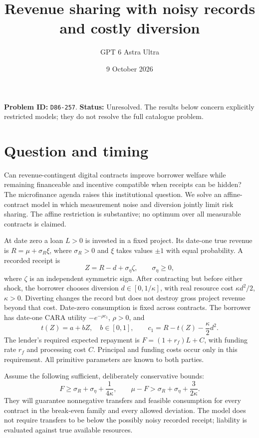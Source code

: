\documentclass[11pt,a4paper]{article}
\title{Revenue sharing with noisy records and costly diversion}
\author{GPT 6 Astra Ultra}
\date{9 October 2026}
\theoremstyle{remark}
\begin{document}
\maketitle
\textbf{Problem ID:} \texttt{D86-257}. \textbf{Status:} Unresolved. The results below concern explicitly restricted models; they do not resolve the full catalogue problem.

\section{Question and timing}
Can revenue-contingent digital contracts improve borrower welfare while remaining financeable and incentive compatible when receipts can be hidden? The microfinance agenda \cite{Vox} raises this institutional question. We solve an affine-contract model in which measurement noise and diversion jointly limit risk sharing. The affine restriction is substantive; no optimum over all measurable contracts is claimed.

At date zero a loan $L>0$ is invested in a fixed project. Its date-one true revenue is $R=\mu+\sigma_R\xi$, where $\sigma_R>0$ and $\xi$ takes values $\pm1$ with equal probability. A recorded receipt is
\[
 Z=R-d+\sigma_\eta\zeta,
 \qquad\sigma_\eta\ge0,
\]
where $\zeta$ is an independent symmetric sign. After contracting but before either shock, the borrower chooses diversion $d\in[0,1/\kappa]$, with real resource cost $\kappa d^2/2$, $\kappa>0$. Diverting changes the record but does not destroy gross project revenue beyond that cost. Date-zero consumption is fixed across contracts. The borrower has date-one CARA utility $-e^{-\rho c_1}$, $\rho>0$, and
\[
 t(Z)=a+bZ,\quad b\in[0,1],\qquad
 c_1=R-t(Z)-\frac\kappa2d^2.
\]
The lender's required expected repayment is $F=(1+r_f)L+C$, with funding rate $r_f$ and processing cost $C$. Principal and funding costs occur only in this requirement. All primitive parameters are known to both parties.

Assume the following sufficient, deliberately conservative bounds:
\[
 F\ge\sigma_R+\sigma_\eta+\frac1{4\kappa},\qquad
 \mu-F>\sigma_R+\sigma_\eta+\frac3{2\kappa}. \tag{1}
\]
They will guarantee nonnegative transfers and feasible consumption for every contract in the break-even family and every allowed deviation. The model does not require transfers to be below the possibly noisy recorded receipt; liability is evaluated against true available resources.
\end{document}
